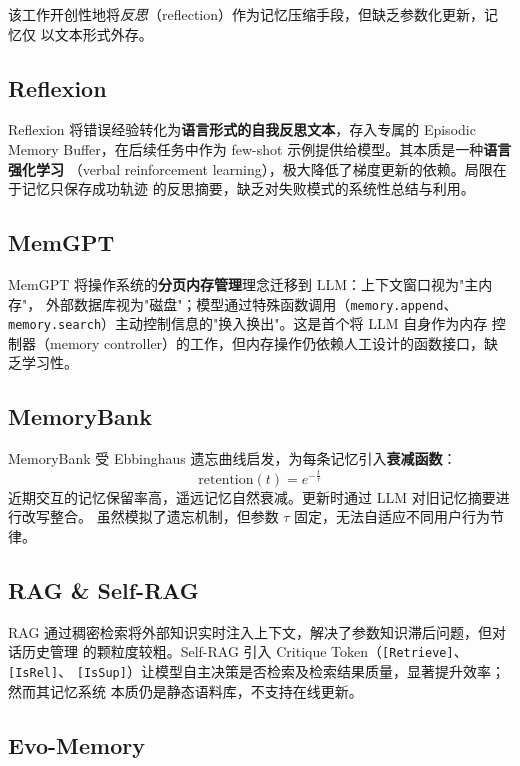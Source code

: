 \documentclass[11pt,a4paper]{article}
\begin{document}
该工作开创性地将\emph{反思}（reflection）作为记忆压缩手段，但缺乏参数化更新，记忆仅
以文本形式外存。

\subsection{Reflexion}

Reflexion 将错误经验转化为\textbf{语言形式的自我反思文本}，存入专属的 Episodic Memory
Buffer，在后续任务中作为 few-shot 示例提供给模型。其本质是一种\textbf{语言强化学习}
（verbal reinforcement learning），极大降低了梯度更新的依赖。局限在于记忆只保存成功轨迹
的反思摘要，缺乏对失败模式的系统性总结与利用。

\subsection{MemGPT}

MemGPT 将操作系统的\textbf{分页内存管理}理念迁移到 LLM：上下文窗口视为"主内存"，
外部数据库视为"磁盘"；模型通过特殊函数调用（\texttt{memory.append}、
\texttt{memory.search}）主动控制信息的"换入换出"。这是首个将 LLM 自身作为内存
控制器（memory controller）的工作，但内存操作仍依赖人工设计的函数接口，缺乏学习性。

\subsection{MemoryBank}

MemoryBank 受 Ebbinghaus 遗忘曲线启发，为每条记忆引入\textbf{衰减函数}：
$$
\text{retention}(t) = e^{-\frac{t}{\tau}}
$$
近期交互的记忆保留率高，遥远记忆自然衰减。更新时通过 LLM 对旧记忆摘要进行改写整合。
虽然模拟了遗忘机制，但参数 $\tau$ 固定，无法自适应不同用户行为节律。

\subsection{RAG \& Self-RAG}

RAG 通过稠密检索将外部知识实时注入上下文，解决了参数知识滞后问题，但对话历史管理
的颗粒度较粗。Self-RAG 引入 Critique Token（\texttt{[Retrieve]}、\texttt{[IsRel]}、
\texttt{[IsSup]}）让模型自主决策是否检索及检索结果质量，显著提升效率；然而其记忆系统
本质仍是静态语料库，不支持在线更新。

\subsection{Evo-Memory}
\end{document}
